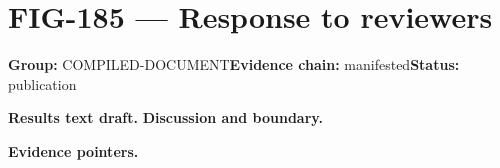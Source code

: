 \clearpage
\section{FIG-185 --- Response to reviewers}
\label{figpage:fig-185}
\textbf{Group:} COMPILED-DOCUMENT\quad \textbf{Evidence chain:} manifested\quad \textbf{Status:} publication

\textbf{Results text draft.} 
\textbf{Discussion and boundary.} 


\textbf{Evidence pointers.}



\vfill
